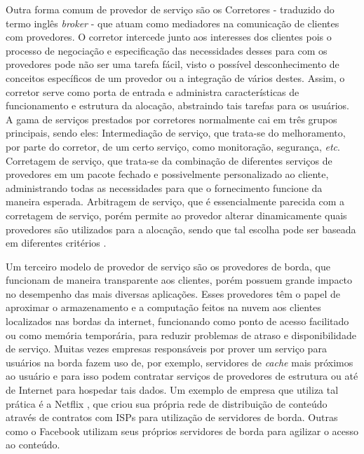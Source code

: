 Outra forma comum de provedor de serviço são os Corretores - traduzido do termo inglês \textit{broker} - que atuam como mediadores na comunicação de clientes com provedores. O corretor intercede junto aos interesses dos clientes pois o processo de negociação e especificação das necessidades desses para com os provedores pode não ser uma tarefa fácil, visto o possível desconhecimento de conceitos específicos de um provedor ou a integração de vários destes. Assim, o corretor serve como porta de entrada e administra características de funcionamento e estrutura da alocação, abstraindo tais tarefas para os usuários. A gama de serviços prestados por corretores normalmente cai em três grupos principais, sendo eles: Intermediação de serviço, que trata-se do melhoramento, por parte do corretor, de um certo serviço, como monitoração, segurança, \textit{etc}. Corretagem de serviço, que trata-se da combinação de diferentes serviços de provedores em um pacote fechado e possivelmente personalizado ao cliente, administrando todas as necessidades para que o fornecimento funcione da maneira esperada. Arbitragem de serviço, que é essencialmente parecida com a corretagem de serviço, porém permite ao provedor alterar dinamicamente quais provedores são utilizados para a alocação, sendo que tal escolha pode ser baseada em diferentes critérios \cite{nuvem_sla:nist_broker}.

%
Um terceiro modelo de provedor de serviço são os provedores de borda, que funcionam de maneira transparente aos clientes, porém possuem grande impacto no desempenho das mais diversas aplicações. Esses provedores têm o papel de aproximar o armazenamento e a computação feitos na nuvem aos clientes localizados nas bordas da internet, funcionando como ponto de acesso facilitado ou como memória temporária, para reduzir problemas de atraso e disponibilidade de serviço. Muitas vezes empresas responsáveis por prover um serviço para usuários na borda fazem uso de, por exemplo, servidores de \textit{cache} mais próximos ao usuário e para isso podem contratar serviços de provedores de estrutura ou até de Internet para hospedar tais dados. Um exemplo de empresa que utiliza tal prática é a Netflix \cite{nuvem_sla:netflix_borda}, que criou sua própria rede de distribuição de conteúdo através de contratos com \acp{ISP} para utilização de servidores de borda. Outras como o Facebook \cite{nuvem_sla:facebook_borda} utilizam seus próprios servidores de borda para agilizar o acesso ao conteúdo.
%
%
